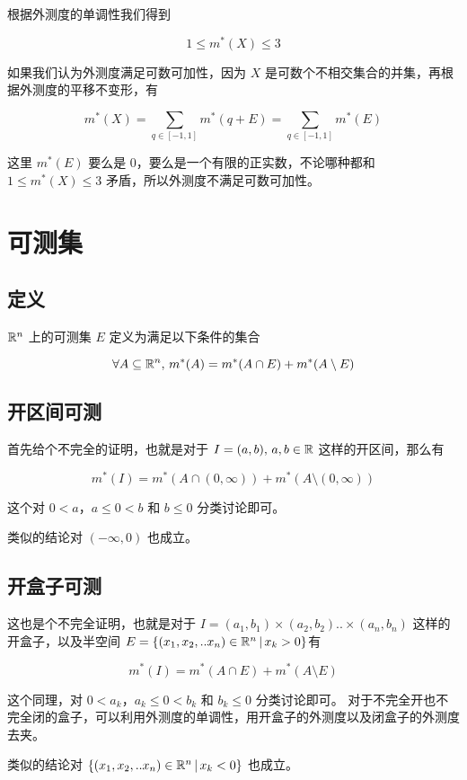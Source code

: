 根据外测度的单调性我们得到

\[
1 \le m^*(X) \le 3
\]

如果我们认为外测度满足可数可加性，因为 $X$ 是可数个不相交集合的并集，再根据外测度的平移不变形，有

\[
m^*(X) = \sum_{q \in [-1,1]}m^*(q+E) =  \sum_{q \in [-1,1]}m^*(E)
\]

这里 $m^*(E)$ 要么是 $0$，要么是一个有限的正实数，不论哪种都和 $1 \le m^*(X) \le 3$ 矛盾，所以外测度不满足可数可加性。


\section{可测集}

\subsection{定义}

$\mathbb{R}^n $ 上的可测集 $E$ 定义为满足以下条件的集合

\[
\forall A \subseteq \mathbb{R}^n,\, m^*(A) = m^*(A \cap E) + m^*(A \setminus E)
\]

\subsection{开区间可测}

首先给个不完全的证明，也就是对于 $I=(a,b),\, a, b \in \mathbb{R}$ 这样的开区间，那么有

\[
m^*(I) = m^*(A \cap (0,\infty)) + m^*(A \setminus (0,\infty))
\]

这个对 $0 < a$，$a \le 0 < b$ 和 $b \le 0$ 分类讨论即可。

类似的结论对 $(-\infty, 0)$ 也成立。

\subsection{开盒子可测}

这也是个不完全证明，也就是对于 $I = (a_1, b_1) \times (a_2, b_2) .. \times (a_n,b_n)$
这样的开盒子，以及半空间 $E = \{ (x_1, x_2, .. x_n) \in \mathbb{R}^n \,\vert\, x_k > 0\}$有

\[
m^*(I) = m^*(A \cap E) + m^*(A \setminus E)
\]

这个同理，对 $0 < a_k$，$a_k \le 0 < b_k$ 和 $b_k \le 0$ 分类讨论即可。
对于不完全开也不完全闭的盒子，可以利用外测度的单调性，用开盒子的外测度以及闭盒子的外测度去夹。

类似的结论对 $\{ (x_1, x_2, .. x_n) \in \mathbb{R}^n \,\vert\, x_k < 0\}$ 也成立。

